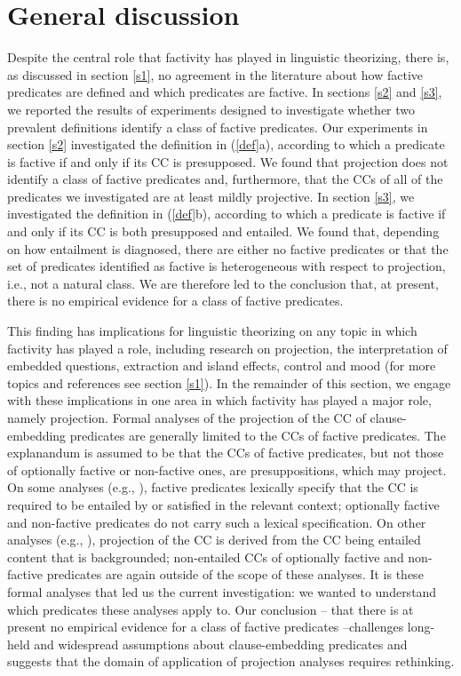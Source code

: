 \documentclass[11pt,fleqn]{article}
\newcommand{\6}{\mbox{$[\hspace*{-.6mm}[$}}
\newcommand{\9}{\mbox{$]\hspace*{-.6mm}]$}}
\begin{document}
\section{General discussion}\label{s4}

Despite the central role that factivity has played in linguistic theorizing, there is, as discussed in section \ref{s1}, no agreement in the literature about how factive predicates are defined and which predicates are factive. In sections \ref{s2} and \ref{s3}, we reported the results of experiments designed to investigate whether two prevalent definitions identify a class of factive predicates. Our experiments in section \ref{s2} investigated the definition in (\ref{def}a), according to which a predicate is factive if and only if its CC is presupposed. We found that projection does not identify a class of factive predicates and, furthermore, that the CCs of all of the predicates we investigated are at least mildly projective. In section \ref{s3}, we investigated the definition in (\ref{def}b), according to which a predicate is factive if and only if its CC is both presupposed and entailed. We found that, depending on how entailment is diagnosed, there are either no factive predicates or that the set of predicates identified as factive is heterogeneous with respect to projection, i.e., not a natural class. We are therefore led to the conclusion that, at present, there is no empirical evidence for a class of factive predicates.

This finding has implications for linguistic theorizing on any topic in which factivity has played a role, including research on projection, the interpretation of embedded questions, extraction and island effects, control and mood (for more topics and references see section \ref{s1}). In the remainder of this section, we engage with these implications in one area in which factivity has played a major role, namely projection. Formal analyses of the projection of the CC of clause-embedding predicates are generally limited to the CCs of factive predicates. The explanandum is assumed to be that the CCs of factive predicates, but not those of optionally factive or non-factive ones, are presuppositions, which may project. On some analyses (e.g., \citealt{heim83,vds92}), factive predicates lexically specify that the CC is required to be entailed by or satisfied in the relevant context; optionally factive and non-factive predicates do not carry such a lexical specification. On other analyses (e.g., \citealt{abrusan2011,abrusan2016,romoli2015,best-question}), projection of the CC is derived from the CC being entailed content that is backgrounded; non-entailed CCs of optionally factive and non-factive predicates are again outside of the scope of these analyses. It is these formal analyses that led us the current investigation: we wanted to understand which predicates these analyses apply to. Our conclusion -- that there is at present no empirical evidence for a class of factive predicates --challenges long-held and widespread assumptions about clause-embedding predicates and suggests that the domain of application of projection analyses requires rethinking.
\end{document}
